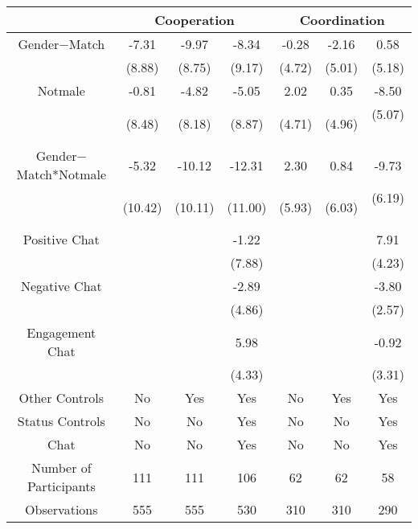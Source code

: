 \begin{table}[htbp]
    \begin{tabular}{c c c c c c c}
    \toprule
          & \multicolumn{3}{c}{Cooperation}   &\multicolumn{3}{c}{Coordination}     \\
\midrule
Gender$-$Match      &  -7.31     &  -9.97   &  -8.34     &    -0.28    &  -2.16         &  0.58   \\
                    &  (8.88)    &  (8.75)  &  (9.17)   &     (4.72)   &  (5.01)        &  (5.18)\\
\addlinespace
Notmale        &  -0.81      &   -4.82   &  -5.05    &   2.02   &   0.35             &  -8.50\sym{*}    \\
                  &  (8.48)     &    (8.18) &  (8.87)   &   (4.71) &   (4.96)           &  (5.07) \ \\
\addlinespace
Gender$-$Match*Notmale &  -5.32 & -10.12   & -12.31    &   2.30   &   0.84           &  -9.73\sym{*}    \\
                  &  (10.42)     &    (10.11) &  (11.00)   &  (5.93) & (6.03)           &  (6.19) \ \\
                        
\addlinespace
Positive  Chat    &           &           &  -1.22     &             &               &  7.91\sym{*} \\
                  &           &           &  (7.88)    &             &                &  (4.23)   \\
\addlinespace
Negative   Chat  &            &           &  -2.89    &               &                &  -3.80   \\
                 &            &           &  (4.86)   &               &                 &  (2.57)  \\
\addlinespace
Engagement  Chat   &         &            &   5.98     &              &                &  -0.92 \\
                   &         &            &  (4.33)   &               &                &  (3.31) \\

\midrule
Other Controls      &   No   &  Yes     &    Yes    &    No    &    Yes  &    Yes \\
Status Controls     &   No   &    No    &    Yes    &    No    &   No    &    Yes \\
Chat                &    No  &    No    &    Yes     &    No    &    No   &    Yes             \\
\midrule
Number of Participants & 111   &    111 &    106  &   62   &    62 &    58     \\
\midrule
Observations          &   555   &  555  &  530   &  310     &  310   &  290             \\
\bottomrule


\end{tabular}
\end{table}
